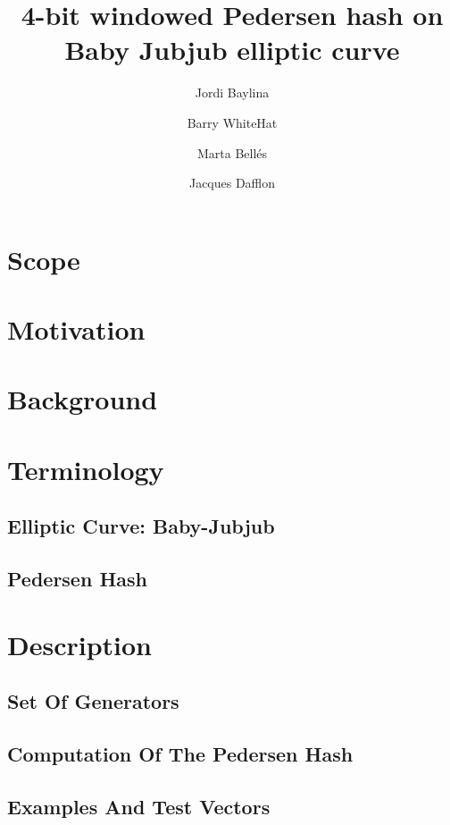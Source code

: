 \documentclass[11pt]{article}
\title{4-bit windowed Pedersen hash on Baby Jubjub elliptic curve}
\author[1]{Jordi Baylina}
\author[2]{Barry WhiteHat}
\author[1,3]{Marta Bellés}
\author[1]{Jacques Dafflon}
\affil[1]{iden3}
\affil[2]{Ethereum foundation}
\affil[3]{Universitat Pompeu Fabra}
\date{} %
\begin{document}
	{\maketitle}
	\vspace{-0.2cm}
	\tableofcontents
	
	
	\newpage

    \section{Scope}
        
	\section{Motivation}
        
    \section{Background}
        

	\section{Terminology}	
		\subsection{Elliptic Curve: Baby-Jubjub}
			
		\subsection{Pedersen Hash}
			
	
	\section{Description}
	
	\subsection{Set Of Generators}
		
		\subsection{Computation Of The Pedersen Hash}
		
		\label{sec-computation}
		\subsection{Examples And Test Vectors}
		
\end{document}
